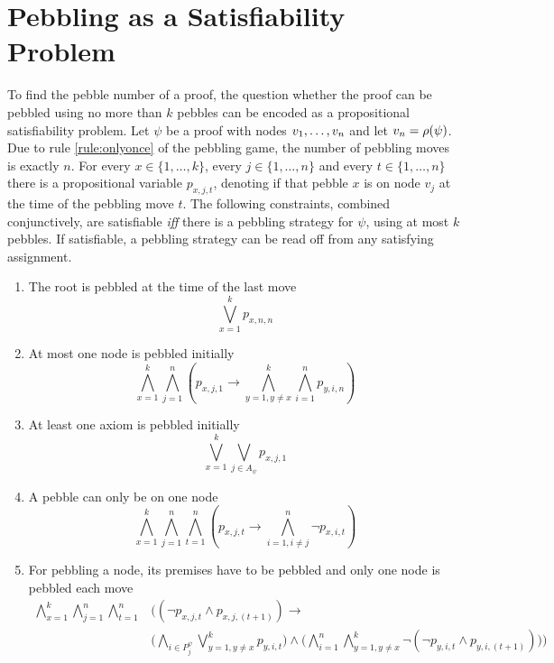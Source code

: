 \documentclass{llncs}
\newcommand{\Premises}[2]{P_{#1}^{#2}}
\newcommand{\Axioms}[1]{A_{#1}}
\begin{document}
\section{Pebbling as a Satisfiability Problem}
\label{sec:PebblingAsSat}

To find the pebble number of a proof, the question whether the proof can be pebbled using no more than $k$ pebbles can be encoded as a propositional satisfiability problem.
Let $\psi$ be a proof with nodes $v_1,\ldots,v_n$ and let $v_n = \rho(\psi)$. 
Due to rule \ref{rule:onlyonce} of the pebbling game, the number of pebbling moves is exactly $n$. For every $x \in \{1,\ldots,k\}$, every $j \in \{1,\ldots,n\}$ and every $t \in \{1,\ldots,n\}$ there is a propositional variable $p_{x,j,t}$, denoting if that pebble $x$ is on node $v_j$ at the time of the pebbling move $t$. The following constraints, combined conjunctively, are satisfiable \textit{iff} there is a pebbling strategy for $\psi$, using at most $k$ pebbles. If satisfiable, a pebbling strategy can be read off from any satisfying assignment.

\begin{enumerate}
	\item The root is pebbled at the time of the last move
				$$\bigvee_{x = 1}^k p_{x,n,n}$$
				
	\item At most one node is pebbled initially\\
				$$\bigwedge_{x = 1}^k \bigwedge_{j = 1}^n \left( p_{x,j,1} \rightarrow \bigwedge_{y = 1, y \neq x}^k \bigwedge_{i = 1}^n p_{y,i,n} \right)$$
	
	\item At least one axiom is pebbled initially\\
				$$\bigvee_{x = 1}^k \bigvee_{j \in \Axioms{\psi}} p_{x,j,1}$$
				
	\item A pebble can only be on one node
				$$\bigwedge_{x = 1}^k \bigwedge_{j = 1}^n \bigwedge_{t = 1}^n \left( p_{x,j,t} \rightarrow \bigwedge_{i = 1, i \neq j}^n \neg p_{x,i,t} \right)$$ 
				
	\item \label{c:pebble} For pebbling a node, its premises have to be pebbled and only one node is pebbled each move\\
				\begin{align*}
					\bigwedge_{x = 1}^k \bigwedge_{j = 1}^n \bigwedge_{t = 1}^n & \Bigg( \left(\neg p_{x,j,t} \wedge p_{x,j,(t+1)} \right)\rightarrow \\
					&\bigg( \bigwedge_{i \in \Premises{j}{\psi}} \bigvee_{y = 1, y \neq x}^k p_{y,i,t} \bigg) \wedge 
					\bigg( \bigwedge_{i = 1}^n \bigwedge_{y = 1, y \neq x}^k \neg \left( \neg p_{y,i,t} \wedge p_{y,i,(t+1)} \right) \bigg) \Bigg)
				\end{align*}
				
\end{enumerate}
\end{document}
